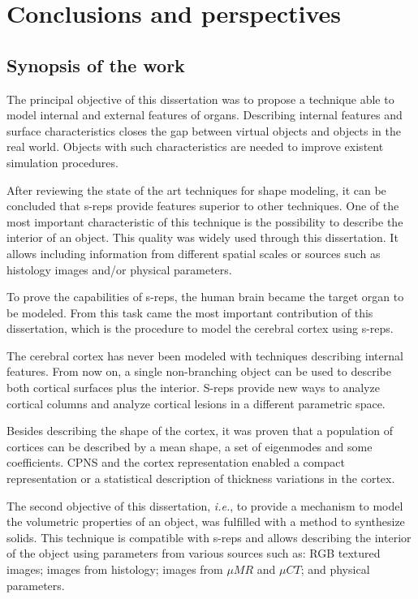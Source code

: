 \chapter{Conclusions and perspectives}
\label{chapter:Conclusions}

\section{Synopsis of the work}

The principal objective of this dissertation was to propose a technique able 
to model internal and external features of organs. 
Describing internal features and 
surface characteristics closes the gap 
between virtual objects and objects in the real world. 
Objects with such characteristics are needed to improve 
existent simulation procedures. 

After reviewing the state of the art techniques for 
shape modeling, it can be concluded that 
s-reps provide features superior to other techniques. 
One of the most important characteristic of this technique
is the possibility to describe the interior of an object. 
This quality was widely used through this dissertation.
It allows including information from different spatial scales
or sources such as histology images and/or physical parameters. 

To prove the capabilities of s-reps, 
the human brain became the target organ to be modeled.
From this task came the 
most important contribution of this dissertation,
which is the procedure to model the 
cerebral cortex using s-reps. 

The cerebral cortex has never been modeled 
with techniques describing internal features. 
From now on, a single non-branching object 
can be used to describe both cortical surfaces plus the interior. 
S-reps provide new ways to analyze cortical columns and analyze cortical lesions in a different parametric space.

Besides describing the shape of the cortex, it was proven 
that a population of cortices can be described by a mean shape, a set of eigenmodes 
and some coefficients. CPNS and the cortex representation 
enabled a compact representation or a statistical description of thickness 
variations in the cortex. 

The second objective of this dissertation, \textit{i.e.}, 
to provide a mechanism to model the volumetric properties of an object,
was fulfilled with a method to synthesize solids. 
This technique is compatible with s-reps and 
allows describing the interior of the object using parameters from various sources such as: 
RGB textured images; images from histology; images from $\mu MR$ and $\mu CT$; and physical parameters. 


